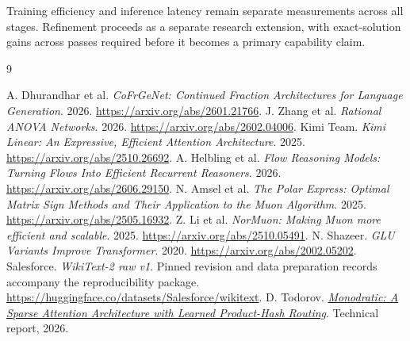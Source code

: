 \documentclass[11pt]{article}
\begin{document}
Training efficiency and inference latency remain separate measurements across
all stages. Refinement proceeds as a separate research extension, with
exact-solution gains across passes required before it becomes a primary
capability claim.

\begin{thebibliography}{9}
\small\raggedright\setlength{\itemsep}{0pt}
 A. Dhurandhar et al. \emph{CoFrGeNet: Continued Fraction Architectures for Language Generation}. 2026. \url{https://arxiv.org/abs/2601.21766}.
 J. Zhang et al. \emph{Rational ANOVA Networks}. 2026. \url{https://arxiv.org/abs/2602.04006}.
 Kimi Team. \emph{Kimi Linear: An Expressive, Efficient Attention Architecture}. 2025. \url{https://arxiv.org/abs/2510.26692}.
 A. Helbling et al. \emph{Flow Reasoning Models: Turning Flows Into Efficient Recurrent Reasoners}. 2026. \url{https://arxiv.org/abs/2606.29150}.
 N. Amsel et al. \emph{The Polar Express: Optimal Matrix Sign Methods and Their Application to the Muon Algorithm}. 2025. \url{https://arxiv.org/abs/2505.16932}.
 Z. Li et al. \emph{NorMuon: Making Muon more efficient and scalable}. 2025. \url{https://arxiv.org/abs/2510.05491}.
 N. Shazeer. \emph{GLU Variants Improve Transformer}. 2020. \url{https://arxiv.org/abs/2002.05202}.
 Salesforce. \emph{WikiText-2 raw v1}. Pinned revision and data preparation records accompany the reproducibility package. \url{https://huggingface.co/datasets/Salesforce/wikitext}.
 D. Todorov. \href{https://github.com/MisulOrg/Monodratic/blob/main/output/pdf/monodratic_proof.pdf}{\emph{Monodratic: A Sparse Attention Architecture with Learned Product-Hash Routing}}. Technical report, 2026.
\end{thebibliography}
\end{document}
